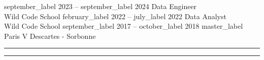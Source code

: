 \documentclass[9pt]{developercv} %
\begin{document}


    \begin{entrylist}
        \entry
        {{{september_label}} 2023 -- {{september_label}} 2024}
        {Data Engineer    \\\footnotesize{Wild Code School}}
        {}
        {}
        \entry
        {{{february_label}} 2022 -- {{july_label}} 2022}
        {Data Analyst     \\\footnotesize{Wild Code School}}
        {}
        {}
        \entry
        {{{september_label}} 2017 -- {{october_label}} 2018}
        {{{master_label}} \\\footnotesize{Paris V Descartes - Sorbonne}}
        {}
        {}
    \end{entrylist}
    \noindent
    \textcolor{line-color}{\rule{0.25\textwidth}{0.5pt}} %
    \hfill
    \textcolor{line-color}{\rule{0.725\textwidth}{0.5pt}} %

\end{document}
